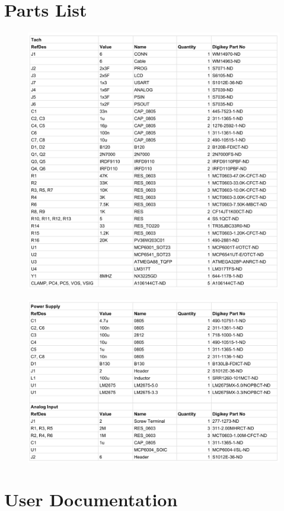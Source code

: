 \documentclass[11pt]{article}
\begin{document}
\section{Parts List}
\label{app:parts}
\begin{figure}[H]
    \centering
    \includegraphics[width=\textwidth]{documents/bom_1}
\end{figure}

\begin{figure}[H]
    \centering
    \includegraphics[width=\textwidth]{documents/bom_2}
\end{figure}

\newpage\clearpage
\section{User Documentation}
\label{app:user}

\end{document}
